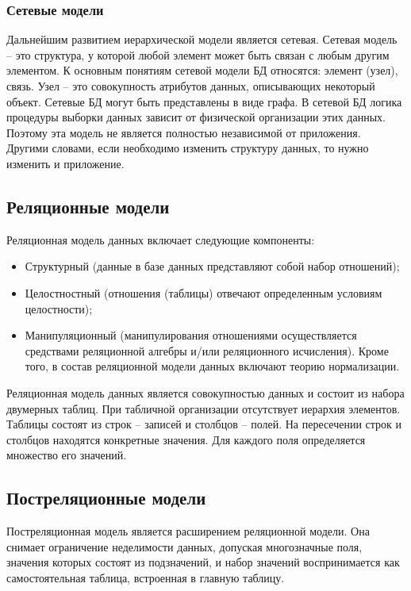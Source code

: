 \subsubsection{Сетевые модели}
Дальнейшим развитием иерархической модели является сетевая. Сетевая модель -- это структура, у которой любой элемент может быть связан с любым другим элементом\cite{интуит}.
К основным понятиям сетевой модели БД относятся: элемент (узел), связь. Узел -- это совокупность атрибутов данных, 
описывающих некоторый объект. Сетевые БД могут быть представлены в виде графа. В сетевой БД логика процедуры 
выборки данных зависит от физической организации этих данных. Поэтому эта модель не является полностью 
независимой от приложения. Другими словами, если необходимо изменить структуру данных, то нужно изменить и 
приложение.

\subsection{Реляционные модели}

Реляционная модель данных включает следующие компоненты: 
\begin{itemize}[label=--]
    \item Структурный (данные в базе данных представляют собой набор отношений);
    \item Целостностный (отношения (таблицы) отвечают определенным условиям целостности);
    \item Манипуляционный (манипулирования отношениями осуществляется средствами реляционной алгебры и/или реляционного исчисления). Кроме того, в состав реляционной модели данных включают теорию нормализации.
\end{itemize}

Реляционная модель данных является совокупностью данных и состоит из
набора двумерных таблиц. При табличной организации отсутствует иерархия
элементов. Таблицы состоят из строк -- записей и столбцов -- полей. На
пересечении строк и столбцов находятся конкретные значения. Для каждого
поля определяется множество его значений.

\subsection{Постреляционные модели}

Постреляционная модель является расширением реляционной модели\cite{БГЭУ}. Она снимает ограничение неделимости данных, допуская многозначные поля, значения которых состоят из подзначений, и набор значений воспринимается как самостоятельная таблица, встроенная в главную таблицу.

